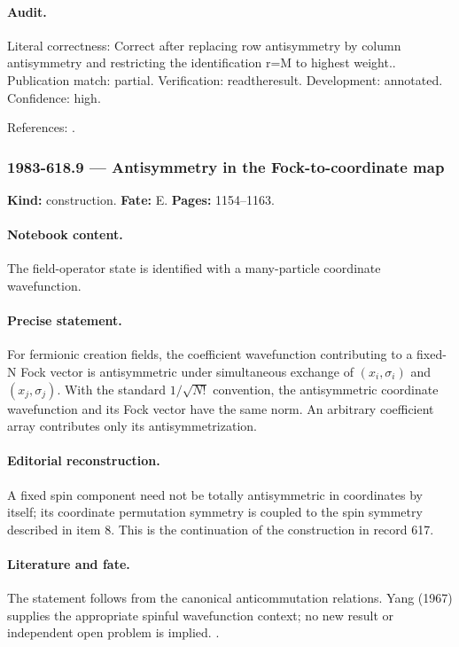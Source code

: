 \paragraph{Audit.} Literal correctness: Correct after replacing row antisymmetry by column antisymmetry and restricting the identification r=M to highest weight.. Publication match: partial. Verification: readtheresult. Development: annotated. Confidence: high.

\noindent References: \citep{yang1967manybody,framerobinsonthrall1954hook}.\par

\subsubsection{1983-618.9 --- Antisymmetry in the Fock-to-coordinate map}

\label{item:1983-618.9}

\noindent\textbf{Kind:} construction. \textbf{Fate:} E. \textbf{Pages:} 1154--1163.\par

\paragraph{Notebook content.} The field-operator state is identified with a many-particle coordinate wavefunction.

\paragraph{Precise statement.} For fermionic creation fields, the coefficient wavefunction contributing to a fixed-N Fock vector is antisymmetric under simultaneous exchange of $(x_i,\sigma_i)$ and $(x_j,\sigma_j)$. With the standard $1/\sqrt{N!}$ convention, the antisymmetric coordinate wavefunction and its Fock vector have the same norm. An arbitrary coefficient array contributes only its antisymmetrization.

\paragraph{Editorial reconstruction.} A fixed spin component need not be totally antisymmetric in coordinates by itself; its coordinate permutation symmetry is coupled to the spin symmetry described in item 8. This is the continuation of the construction in record 617.

\paragraph{Literature and fate.} The statement follows from the canonical anticommutation relations. Yang (1967) supplies the appropriate spinful wavefunction context; no new result or independent open problem is implied. \citep{yang1967manybody}.

